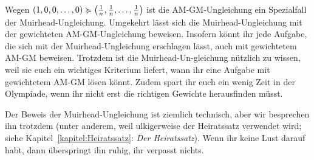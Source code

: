 Wegen $(1,0,0,\dotsc,0)\succcurlyeq \parens[\big]{\frac1n,\frac1n,\dotsc,\frac1n}$ ist die AM-GM-Ungleichung ein Spezialfall der Muirhead-Ungleichung. Umgekehrt lässt sich die Muirhead-Ungleichung mit der gewichteten AM-GM-Ungleichung beweisen. Insofern könnt ihr jede Aufgabe, die sich mit der Muirhead-Ungleichung erschlagen lässt, auch mit gewichtetem AM-GM beweisen. Trotzdem ist die Muirhead-Un-gleichung nützlich zu wissen, weil sie euch ein wichtiges Kriterium liefert, wann ihr eine Aufgabe mit gewichtetem AM-GM lösen könnt. Zudem spart ihr euch ein wenig Zeit in der Olympiade, wenn ihr nicht erst die richtigen Gewichte herausfinden müsst.

Der Beweis der Muirhead-Ungleichung ist ziemlich technisch, aber wir besprechen ihn trotzdem (unter anderem, weil ulkigerweise der Heiratssatz verwendet wird; siehe Kapitel~\ref{kapitel:Heiratssatz}: \emph{Der Heiratssatz}). Wenn ihr keine Lust darauf habt, dann überspringt ihn ruhig, ihr verpasst nichts.


